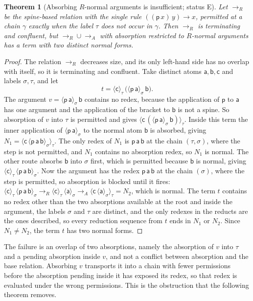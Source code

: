 \documentclass[11pt]{article}
\newtheorem{theorem}{Theorem}[section]
\theoremstyle{definition}
\theoremstyle{remark}
\newcommand{\br}[2]{\langle #1\rangle_{#2}}
\newcommand{\Et}{status E}
\begin{document}
\begin{theorem}[Absorbing $R$-normal arguments is insufficient; \Et]\label{thm:nfinsufficient}
Let $\to_R$ be the spine-based relation with the single rule $((\mathsf p\,x)\,y)\to x$, permitted at a chain $\gamma$ exactly when the label $\tau$ does not occur in $\gamma$. Then $\to_R$ is terminating and confluent, but $\to_R\cup\to_A$ with absorption restricted to $R$-normal arguments has a term with two distinct normal forms.
\end{theorem}

\begin{proof}
The relation $\to_R$ decreases size, and its only left-hand side has no overlap with itself, so it is terminating and confluent. Take distinct atoms $\mathsf a,\mathsf b,\mathsf c$ and labels $\sigma,\tau$, and let
\[
t=\br{\mathsf c}\tau\,\bigl(\br{\mathsf p\,\mathsf a}\sigma\,\mathsf b\bigr).
\]
The argument $v=\br{\mathsf p\,\mathsf a}\sigma\,\mathsf b$ contains no redex, because the application of $\mathsf p$ to $\mathsf a$ has one argument and the application of the bracket to $\mathsf b$ is not a spine. So absorption of $v$ into $\tau$ is permitted and gives $\br{\mathsf c\,(\br{\mathsf p\,\mathsf a}\sigma\,\mathsf b)}\tau$. Inside this term the inner application of $\br{\mathsf p\,\mathsf a}\sigma$ to the normal atom $\mathsf b$ is absorbed, giving $N_1=\br{\mathsf c\,\br{\mathsf p\,\mathsf a\,\mathsf b}\sigma}\tau$. The only redex of $N_1$ is $\mathsf p\,\mathsf a\,\mathsf b$ at the chain $(\tau,\sigma)$, where the step is not permitted, and $N_1$ contains no absorption redex, so $N_1$ is normal. The other route absorbs $\mathsf b$ into $\sigma$ first, which is permitted because $\mathsf b$ is normal, giving $\br{\mathsf c}\tau\,\br{\mathsf p\,\mathsf a\,\mathsf b}\sigma$. Now the argument has the redex $\mathsf p\,\mathsf a\,\mathsf b$ at the chain $(\sigma)$, where the step is permitted, so absorption is blocked until it fires: $\br{\mathsf c}\tau\,\br{\mathsf p\,\mathsf a\,\mathsf b}\sigma\to_R\br{\mathsf c}\tau\,\br{\mathsf a}\sigma\to_A\br{\mathsf c\,\br{\mathsf a}\sigma}\tau=N_2$, which is normal. The term $t$ contains no redex other than the two absorptions available at the root and inside the argument, the labels $\sigma$ and $\tau$ are distinct, and the only redexes in the reducts are the ones described, so every reduction sequence from $t$ ends in $N_1$ or $N_2$. Since $N_1\ne N_2$, the term $t$ has two normal forms.
\end{proof}

The failure is an overlap of two absorptions, namely the absorption of $v$ into $\tau$ and a pending absorption inside $v$, and not a conflict between absorption and the base relation. Absorbing $v$ transports it into a chain with fewer permissions before the absorption pending inside it has exposed its redex, so that redex is evaluated under the wrong permissions. This is the obstruction that the following theorem removes.
\end{document}
